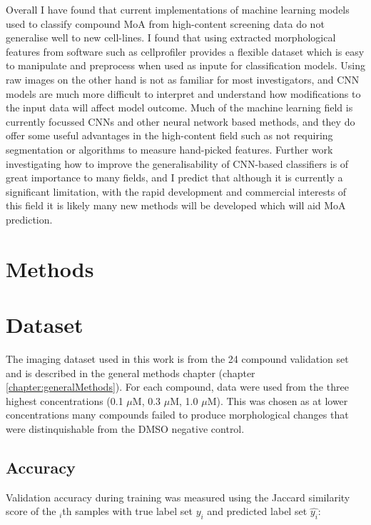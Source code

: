 \documentclass[a4paper,11pt,twoside,openright]{scrbook}
\begin{document}
Overall I have found that current implementations of machine learning models used to classify compound MoA from high-content screening data do not generalise well to new cell-lines.
I found that using extracted morphological features from software such as cellprofiler provides a flexible dataset which is easy to manipulate and preprocess when used as inpute for classification models.
Using raw images on the other hand is not as familiar for most investigators, and CNN models are much more difficult to interpret and understand how modifications to the input data will affect model outcome.
Much of the machine learning field is currently focussed CNNs and other neural network based methods, and they do offer some useful advantages in the high-content field such as not requiring segmentation or algorithms to measure hand-picked features.
Further work investigating how to improve the generalisability of CNN-based classifiers is of great importance to many fields, and I predict that although it is currently a significant limitation, with the rapid development and commercial interests of this field it is likely many new methods will be developed which will aid MoA prediction.





\section{Methods}

\section{Dataset}
The imaging dataset used in this work is from the 24 compound validation set and is described in the general methods chapter (chapter \ref{chapter:generalMethods}).
For each compound, data were used from the three highest concentrations (0.1 $\mu$M, 0.3 $\mu$M, 1.0 $\mu$M).
This was chosen as at lower concentrations many compounds failed to produce morphological changes that were distinquishable from the DMSO negative control.

\subsection{Accuracy}
Validation accuracy during training was measured using the Jaccard similarity score of the $_i$th samples with true label set $y_i$ and predicted label set $\hat{y_i}$:
\end{document}
